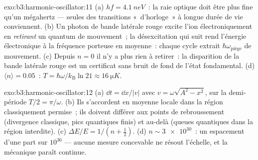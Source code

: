 \begin{solution}{exo:b3:harmonic-oscillator:11}
(a) $hf = \qty{4.1}{neV}$~: la raie optique doit être plus fine qu'un
mégahertz --- seules des transitions «~d'horloge~» à longue durée de
vie conviennent. (b) Un photon de bande latérale rouge excite l'ion
électroniquement en \emph{retirant} un quantum de mouvement~; la
désexcitation qui suit rend l'énergie électronique à la fréquence
porteuse en moyenne~: chaque cycle extrait
$\hbar\omega_{\text{piège}}$ de mouvement. (c) Depuis $n = 0$
il n'y a plus rien à retirer~: la disparition de la bande latérale
rouge est un certificat sans bruit de fond de l'état fondamental. (d)
$\langle n\rangle = 0.05$~: $T = \hbar\omega/k_{\text{B}}\ln21
\approx \qty{16}{\micro K}$.
\end{solution}

\begin{solution}{exo:b3:harmonic-oscillator:12}
(a) $\dd t = \dd x/|v|$ avec $v = \omega\sqrt{A^2 - x^2}$, sur la
demi-période $T/2 = \pi/\omega$. (b) Ils s'accordent en moyenne locale
dans la région classiquement permise~; ils doivent différer aux points
de rebroussement (divergence classique, pics quantiques finis) et
au-delà (queues quantiques dans la région interdite). (c) $\Delta E/E = 1/(n +
\tfrac12)$. (d) $n \sim \num{3e30}$~: un espacement d'une part sur
$10^{30}$ --- aucune mesure concevable ne résout l'échelle, et la
mécanique paraît continue.
\end{solution}

